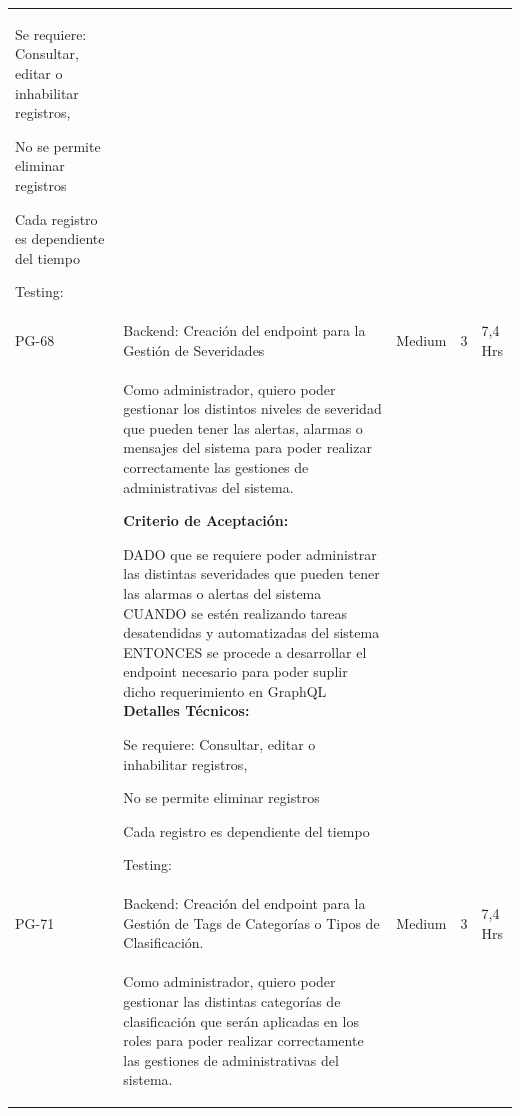 \documentclass[11pt]{charter}
\begin{document}
\begin{landscape}
\begin{tabularx}{\linewidth}{@{}|p{1.3cm}|p{17cm}|p{1.7cm}|p{1.5cm}|p{1.7cm}|@{}}
\begin{description}
                         \item Se requiere: Consultar, editar o inhabilitar registros, 
                         \item No se permite eliminar registros 
                         \item Cada registro es dependiente del tiempo                 
                   \item Testing:                 
            \end{description}                 &  &     & \\
PG-68    & Backend: Creación del endpoint   para la Gestión de Severidades    & Medium             & 3   & 7,4  Hrs          \\
         &  \begin{description}                 
                   \item Como administrador, quiero poder   gestionar los distintos niveles de severidad que pueden tener las alertas,   alarmas o mensajes del sistema para poder realizar correctamente las   gestiones de administrativas del sistema.                 
                   \item \textbf{Criterio de Aceptación:}                 
                   \item DADO que se requiere poder administrar las distintas severidades que pueden   tener las alarmas o alertas del sistema CUANDO se estén realizando tareas desatendidas y automatizadas del   sistema ENTONCES se procede a desarrollar el endpoint necesario para poder suplir dicho requerimiento en GraphQL             
                   \textbf{Detalles Técnicos:} 
                         \item Se requiere: Consultar, editar o inhabilitar registros, 
                         \item No se permite eliminar registros 
                         \item Cada registro es dependiente del tiempo                 
                   \item Testing:
            \end{description}  &  &     & \\
PG-71    & Backend: Creación del endpoint   para la Gestión de Tags de Categorías o Tipos de Clasificación.       & Medium             & 3   & 7,4  Hrs          \\
         &  \begin{description}                 
                   \item Como administrador, quiero poder   gestionar las distintas categorías de clasificación que serán aplicadas en los   roles para poder realizar correctamente las gestiones de administrativas del   sistema.                 

\end{description}
\end{tabularx}
\end{landscape}
\end{document}
